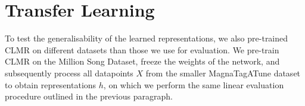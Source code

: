 \section{Transfer Learning}
To test the generalisability of the learned representations, we also pre-trained CLMR on different datasets than those we use for evaluation. We pre-train CLMR on the Million Song Dataset, freeze the weights of the network, and subsequently process all datapoints $X$ from the smaller MagnaTagATune dataset to obtain representations $h$, on which we perform the same linear evaluation procedure outlined in the previous paragraph.



